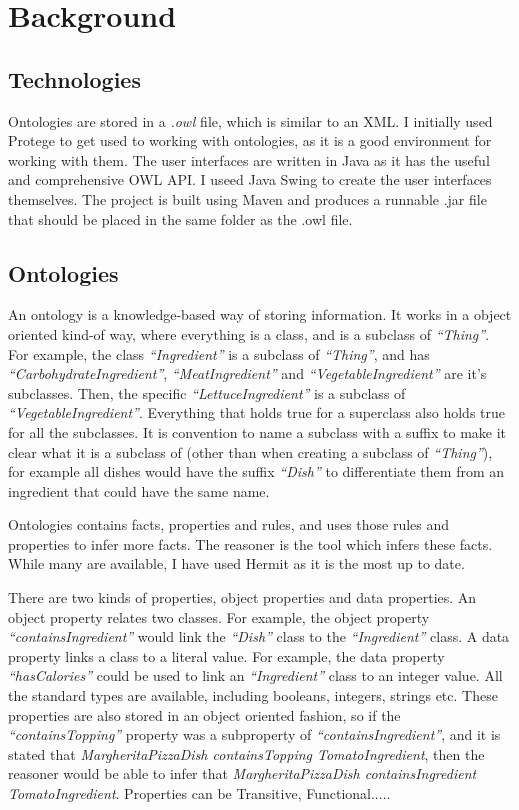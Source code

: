 \chapter{Background}

\section{Technologies}

Ontologies are stored in a \textit{.owl} file, which is similar to an XML. I initially used Protege to get used to working with ontologies, as it is a good environment for working with them. The user interfaces are written in Java as it has the useful and comprehensive OWL API\cite{owl_api}. I useed Java Swing to create the user interfaces themselves. The project is built using Maven and produces a runnable .jar file that should be placed in the same folder as the .owl file.


\section{Ontologies}

An ontology is a knowledge-based way of storing information. It works in a object oriented kind-of way, where everything is a class, and is a subclass of \textit{``Thing''}. For example, the class \textit{``Ingredient''} is a subclass of \textit{``Thing''}, and has \textit{``CarbohydrateIngredient''}, \textit{``MeatIngredient''} and \textit{``VegetableIngredient''} are it's subclasses. Then, the specific \textit{``LettuceIngredient''} is a subclass of \textit{``VegetableIngredient''}. Everything that holds true for a superclass also holds true for all the subclasses. It is convention to name a subclass with a suffix to make it clear what it is a subclass of (other than when creating a subclass of \textit{``Thing''}), for example all dishes would have the suffix \textit{``Dish''} to differentiate them from an ingredient that could have the same name. 

Ontologies contains facts, properties and rules, and uses those rules and properties to infer more facts. The reasoner is the tool which infers these facts. While many are available, I have used Hermit\cite{hermit} as it is the most up to date.

There are two kinds of properties, object properties and data properties. An object property relates two classes. For example, the object property \textit{``containsIngredient''} would link the \textit{``Dish''} class to the \textit{``Ingredient''} class. A data property links a class to a literal value. For example, the data property \textit{``hasCalories''} could be used to link an \textit{``Ingredient''} class to an integer value. All the standard types are available, including booleans, integers, strings etc. These properties are also stored in an object oriented fashion, so if the \textit{``containsTopping''} property was a subproperty of \textit{``containsIngredient''}, and it is stated that \textit{MargheritaPizzaDish containsTopping TomatoIngredient}, then the reasoner would be able to infer that \textit{MargheritaPizzaDish containsIngredient TomatoIngredient}. Properties can be Transitive, Functional.....

